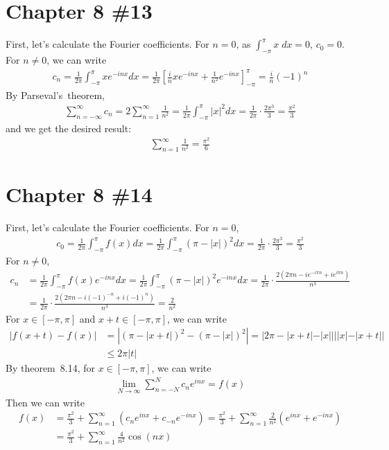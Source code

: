 \documentclass{scrartcl}
\begin{document}
\section{Chapter 8 \#13}
First, let's calculate the Fourier coefficients. For \(n = 0\), as
\(\int^\pi_{-\pi} x\; dx = 0\), \(c_0 = 0\). For \(n \not = 0\), we can write
\begin{align*}
  c_n
  = \frac{1}{2\pi} \int^\pi_{-\pi} xe^{-inx} dx
  = \frac{1}{2\pi} \left[ \frac{i}{n} xe^{-inx}
    + \frac{1}{n^2} e^{-inx} \right]^\pi_{-\pi}
  = \frac{i}{n} (-1)^n
\end{align*}
By Parseval's~theorem,
\begin{align*}
  \sum^\infty_{n = -\infty} c_n
  = 2 \sum^\infty_{n = 1} \frac{1}{n^2}
  = \frac{1}{2\pi} \int^\pi_{-\pi} |x|^2 dx
  = \frac{1}{2\pi} \cdot \frac{2\pi^3}{3}
  = \frac{\pi^2}{3}
\end{align*}
and we get the desired result:
\begin{align*}
  \sum^\infty_{n = 1} \frac{1}{n^2}
  = \frac{\pi^2}{6}
\end{align*}

\section{Chapter 8 \#14}
First, let's calculate the Fourier coefficients. For \(n = 0\),
\begin{align*}
  c_0
  = \frac{1}{2\pi} \int^\pi_{-\pi} f(x) dx
  = \frac{1}{2\pi} \int^\pi_{-\pi} (\pi - |x|)^2 dx
  = \frac{1}{2\pi} \cdot \frac{2\pi^3}{3}
  = \frac{\pi^2}{3}
\end{align*}
For \(n \not = 0\),
\begin{align*}
  c_n
  &= \frac{1}{2\pi} \int^\pi_{-\pi} f(x) e^{-inx} dx
  = \frac{1}{2\pi} \int^\pi_{-\pi} (\pi - |x|)^2 e^{-inx} dx
  = \frac{1}{2\pi} \cdot \frac{2(2\pi n - ie^{-i\pi n} + ie^{i\pi n})}{n^3} \\
  &= \frac{1}{2\pi} \cdot \frac{2(2\pi n - i(-1)^{-n} + i(-1)^n)}{n^3}
  = \frac{2}{n^2}
\end{align*}
For \(x \in [-\pi, \pi]\) and \(x + t \in [-\pi, \pi]\), we can write
\begin{align*}
  |f(x + t) - f(x)|
  &= |(\pi - |x + t|)^2 - (\pi - |x|)^2|
  = |2\pi - |x + t| - |x|| ||x| - |x + t|| \\
  &\le 2\pi |t|
\end{align*}
By theorem~8.14, for \(x \in [-\pi, \pi]\), we can write
\begin{align*}
  \lim_{N \to \infty} \sum^N_{n = -N} c_n e^{inx} = f(x)
\end{align*}
Then we can write
\begin{align*}
  f(x)
  &= \frac{\pi^2}{3} + \sum^\infty_{n = 1} (c_n e^{inx} + c_{-n} e^{-inx})
  = \frac{\pi^2}{3} + \sum^\infty_{n = 1} \frac{2}{n^2} (e^{inx} + e^{-inx}) \\
  &= \frac{\pi^2}{3} + \sum^\infty_{n = 1} \frac{4}{n^2} \cos (nx)
\end{align*}
\end{document}
